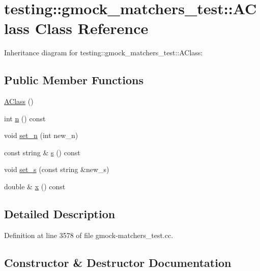 \hypertarget{classtesting_1_1gmock__matchers__test_1_1_a_class}{}\section{testing\+:\+:gmock\+\_\+matchers\+\_\+test\+:\+:A\+Class Class Reference}
\label{classtesting_1_1gmock__matchers__test_1_1_a_class}


Inheritance diagram for testing\+:\+:gmock\+\_\+matchers\+\_\+test\+:\+:A\+Class\+:
\subsection*{Public Member Functions}
\begin{DoxyCompactItemize}
\item 
\hyperlink{classtesting_1_1gmock__matchers__test_1_1_a_class_ac43d717a80bb6fad8c77dc36f963ca88}{A\+Class} ()
\item 
int \hyperlink{classtesting_1_1gmock__matchers__test_1_1_a_class_a6fb09c7c4d2314a2f9af9d07b31d02c1}{n} () const 
\item 
void \hyperlink{classtesting_1_1gmock__matchers__test_1_1_a_class_a3181466cec6faa5ab3c6bc5c4dbf67b2}{set\+\_\+n} (int new\+\_\+n)
\item 
const string \& \hyperlink{classtesting_1_1gmock__matchers__test_1_1_a_class_a4cbf37b13f0f9a2497ef8effc938d0f8}{s} () const 
\item 
void \hyperlink{classtesting_1_1gmock__matchers__test_1_1_a_class_a131c5d2da4b5984f5af3fd84898eaf09}{set\+\_\+s} (const string \&new\+\_\+s)
\item 
double \& \hyperlink{classtesting_1_1gmock__matchers__test_1_1_a_class_a4480f51cb8e304fc5551712a6507a1c9}{x} () const 
\end{DoxyCompactItemize}


\subsection{Detailed Description}


Definition at line 3578 of file gmock-\/matchers\+\_\+test.\+cc.



\subsection{Constructor \& Destructor Documentation}
